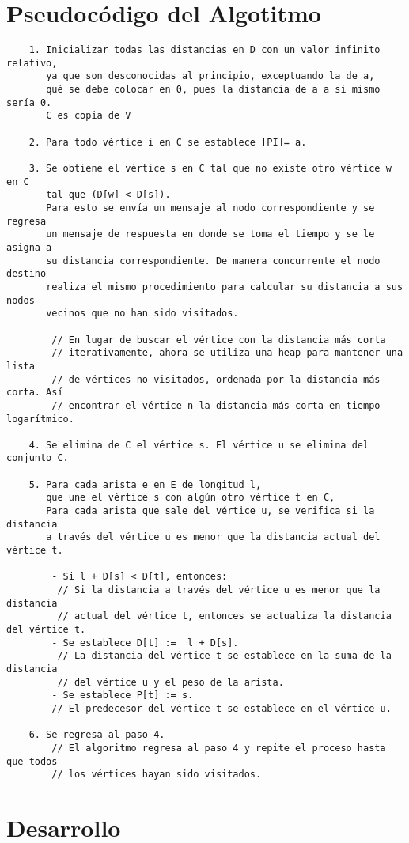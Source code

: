 \documentclass[a4paper,12pt]{article}
\begin{document}
\section*{Pseudocódigo del Algotitmo}
\begin{verbatim}
    1. Inicializar todas las distancias en D con un valor infinito relativo, 
       ya que son desconocidas al principio, exceptuando la de a, 
       qué se debe colocar en 0, pues la distancia de a a si mismo sería 0. 
       C es copia de V        
    
    2. Para todo vértice i en C se establece [PI]= a.        
    
    3. Se obtiene el vértice s en C tal que no existe otro vértice w en C 
       tal que (D[w] < D[s]). 
       Para esto se envía un mensaje al nodo correspondiente y se regresa
       un mensaje de respuesta en donde se toma el tiempo y se le asigna a 
       su distancia correspondiente. De manera concurrente el nodo destino 
       realiza el mismo procedimiento para calcular su distancia a sus nodos
       vecinos que no han sido visitados.
    
        // En lugar de buscar el vértice con la distancia más corta 
        // iterativamente, ahora se utiliza una heap para mantener una lista 
        // de vértices no visitados, ordenada por la distancia más corta. Así 
        // encontrar el vértice n la distancia más corta en tiempo logarítmico.    
    
    4. Se elimina de C el vértice s. El vértice u se elimina del conjunto C.
    
    5. Para cada arista e en E de longitud l, 
       que une el vértice s con algún otro vértice t en C,
       Para cada arista que sale del vértice u, se verifica si la distancia 
       a través del vértice u es menor que la distancia actual del vértice t.
    
        - Si l + D[s] < D[t], entonces:
         // Si la distancia a través del vértice u es menor que la distancia 
         // actual del vértice t, entonces se actualiza la distancia del vértice t.
        - Se establece D[t] :=  l + D[s].
         // La distancia del vértice t se establece en la suma de la distancia 
         // del vértice u y el peso de la arista.
        - Se establece P[t] := s.
        // El predecesor del vértice t se establece en el vértice u.
    
    6. Se regresa al paso 4.
        // El algoritmo regresa al paso 4 y repite el proceso hasta que todos
        // los vértices hayan sido visitados.    
\end{verbatim}
    

\section*{Desarrollo}
\end{document}
